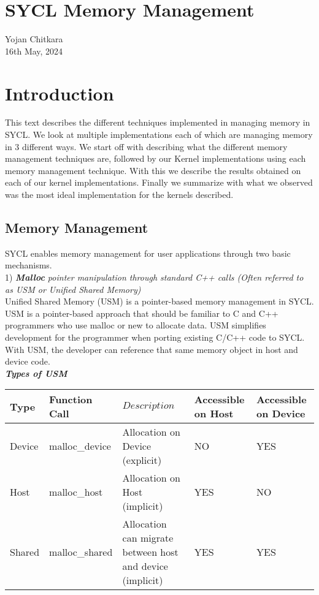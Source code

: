 \documentclass[14pt,fleqn]{article}
\begin{document}
\section{SYCL Memory Management}
Yojan Chitkara\\
16th May, 2024


\section{Introduction}
This text describes the different techniques implemented in managing memory in SYCL. We look at multiple implementations each of which are managing memory in 3 different ways. We start off with describing what the different memory management techniques are, followed by our Kernel implementations using each memory management technique. With this we describe the results obtained on each of our kernel implementations. Finally we summarize with what we observed was the most ideal implementation for the kernels described.
\vspace{10pt}

\subsection{Memory Management}
SYCL enables memory management for user applications through two basic mechanisms. \\

1) \textit{\textbf{Malloc} pointer manipulation through standard C++ calls (Often referred to as USM or Unified Shared Memory)}\\

Unified Shared Memory (USM) is a pointer-based memory management in SYCL. USM is a pointer-based approach that should be familiar to C and C++ programmers who use malloc or new to allocate data. USM simplifies development for the programmer when porting existing C/C++ code to SYCL. With USM, the developer can reference that same memory object in host and device code.\\

\textbf{\textit{Types of USM}} \\

\begin{tabular}{|l|l|l|l|l|}                                   
    \hline\hline         
    Type  & Function Call & $Description$ & Accessible on Host & Accessible on Device \\
    \hline\hline
    Device & malloc\_device & Allocation on Device (explicit) & NO & YES \\ \hline
    Host & malloc\_host & Allocation on Host (implicit) & YES & NO \\ \hline
    Shared & malloc\_shared & Allocation can migrate between host and device (implicit) & YES & YES \\ \hline

\end{tabular}
\newline\newline
\end{document}
